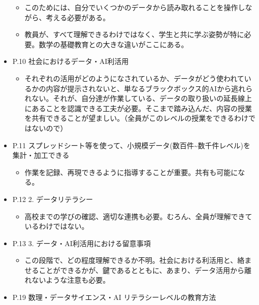 \documentclass[
]{book}
\providecommand{\tightlist}{%
  \setlength{\itemsep}{0pt}\setlength{\parskip}{0pt}}
\theoremstyle{definition}
\theoremstyle{definition}
\theoremstyle{definition}
\theoremstyle{definition}
\theoremstyle{remark}
\begin{document}
\begin{itemize}
  \begin{itemize}
  \tightlist
  \item
    このためには、自分でいくつかのデータから読み取れることを操作しながら、考える必要がある。
  \item
    教員が、すべて理解できるわけではなく、学生と共に学ぶ姿勢が特に必要。数学の基礎教育との大きな違いがここにある。
  \end{itemize}
\item
  P.10 社会におけるデータ・AI利活用

  \begin{itemize}
  \tightlist
  \item
    それぞれの活用がどのようになされているか、データがどう使われているかの内容が提示されないと、単なるブラックボックス的AIから逃れられない。それが、自分達が作業している、データの取り扱いの延長線上にあることを認識できる工夫が必要。そこまで踏み込んだ、内容の授業を共有できることが望ましい。（全員がこのレベルの授業をできるわけではないので）
  \end{itemize}
\item
  P.11 スプレッドシート等を使って、小規模データ(数百件\textasciitilde 数千件レベル)を集計・加工できる

  \begin{itemize}
  \tightlist
  \item
    作業を記録、再現できるように指導することが重要。共有も可能になる。
  \end{itemize}
\item
  P.12 2. データリテラシー

  \begin{itemize}
  \tightlist
  \item
    高校までの学びの確認、適切な連携も必要。むろん、全員が理解できているわけではない。
  \end{itemize}
\item
  P.13 3. データ・AI利活用における留意事項

  \begin{itemize}
  \tightlist
  \item
    この段階で、どの程度理解できるか不明。社会における利活用と、絡ませることができるかが、鍵であるとともに、あまり、データ活用から離れないような注意も必要。
  \end{itemize}
\item
  P.19 数理・データサイエンス・AI リテラシーレベルの教育方法


\end{itemize}
\end{document}

